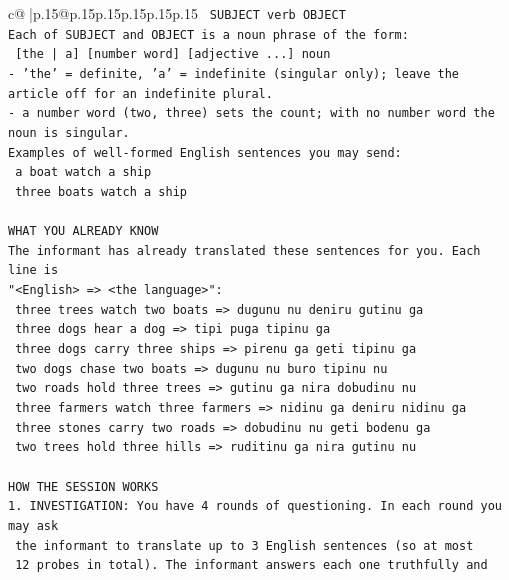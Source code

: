 \documentclass{article}
\begin{document}
{\begin{supertabular}{c@{$\;$}|p{.15\linewidth}@{}p{.15\linewidth}p{.15\linewidth}p{.15\linewidth}p{.15\linewidth}p{.15\linewidth}}
{{{\texttt{    SUBJECT  verb  OBJECT} \\
\texttt{Each of SUBJECT and OBJECT is a noun phrase of the form:} \\
\texttt{    {[}the | a{]}  {[}number word{]}  {[}adjective ...{]}  noun} \\
\texttt{{-} 'the' = definite, 'a' = indefinite (singular only); leave the article off for an indefinite plural.} \\
\texttt{{-} a number word (two, three) sets the count; with no number word the noun is singular.} \\
\texttt{Examples of well{-}formed English sentences you may send:} \\
\texttt{    a boat watch a ship} \\
\texttt{    three boats watch a ship} \\
\\ 
\texttt{WHAT YOU ALREADY KNOW} \\
\texttt{The informant has already translated these sentences for you. Each line is} \\
\texttt{"<English>  =>  <the language>":} \\
\texttt{    three trees watch two boats  =>  dugunu nu deniru gutinu ga} \\
\texttt{    three dogs hear a dog  =>  tipi puga tipinu ga} \\
\texttt{    three dogs carry three ships  =>  pirenu ga geti tipinu ga} \\
\texttt{    two dogs chase two boats  =>  dugunu nu buro tipinu nu} \\
\texttt{    two roads hold three trees  =>  gutinu ga nira dobudinu nu} \\
\texttt{    three farmers watch three farmers  =>  nidinu ga deniru nidinu ga} \\
\texttt{    three stones carry two roads  =>  dobudinu nu geti bodenu ga} \\
\texttt{    two trees hold three hills  =>  ruditinu ga nira gutinu nu} \\
\\ 
\texttt{HOW THE SESSION WORKS} \\
\texttt{1. INVESTIGATION: You have 4 rounds of questioning. In each round you may ask} \\
\texttt{   the informant to translate up to 3 English sentences (so at most} \\
\texttt{   12 probes in total). The informant answers each one truthfully and} \\
}}}
\end{supertabular}}
\end{document}
